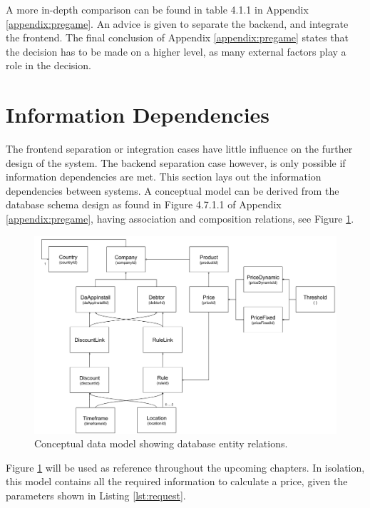 A more in-depth comparison can be found in table 4.1.1 in Appendix \ref{appendix:pregame}. An advice is given to separate the backend, and integrate the frontend. The final conclusion of Appendix \ref{appendix:pregame} states that the decision has to be made on a higher level, as many external factors play a role in the decision.

%
\section{Information Dependencies}
The frontend separation or integration cases have little influence on the further design of the system. The backend separation case however, is only possible if information dependencies are met. This section lays out the information dependencies between systems. A conceptual model can be derived from the database schema design as found in Figure 4.7.1.1 of Appendix \ref{appendix:pregame}, having association and composition relations, see Figure \ref{fig:DataModel}.

\begin{figure}[H]
	\centering
	\includegraphics[width=1\textwidth]{DataModel}
	\caption[DataModel]{Conceptual data model showing database entity relations.}
	\label{fig:DataModel}
\end{figure}

Figure \ref{fig:DataModel} will be used as reference throughout the upcoming chapters. In isolation, this model contains all the required information to calculate a price, given the parameters shown in Listing \ref{lst:request}.

